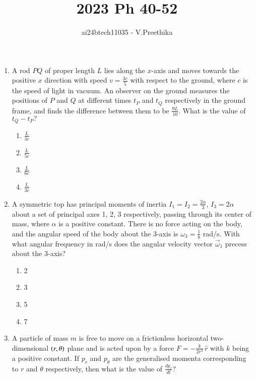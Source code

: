 \documentclass[journal]{IEEEtran}
\begin{document}

\vspace{3cm}

\title{2023 Ph 40-52}
\author{ai24btech11035 - V.Preethika}
\maketitle
\bigskip

\renewcommand{\thefigure}{\theenumi}
\renewcommand{\thetable}{\theenumi}
\begin{enumerate}
\item A rod $PQ$ of proper length $L$ lies along the $x$-axis and moves towards the positive $x$ direction with speed $v = \frac{3c}{5}$ with respect to the ground, where $c$ is the speed of light in vacuum. An observer on the ground measures the positions of $P$ and $Q$ at different times $t_P$ and $t_Q$ respectively in the ground frame, and finds the difference between them to be $\frac{9L}{10}$. What is the value of $t_Q - t_P?$
\begin{figure}[H]
	\centering
	
\end{figure}
\begin{enumerate}
\item $\frac{L}{3c}$
\item $\frac{L}{5c}$
\item $\frac{L}{6c}$
\item $\frac{L}{3c}$
\end{enumerate}
\item A symmetric top has principal moments of inertia $I_1 = I_2 = \frac{2\alpha}{3}$, $I_3 = 2\alpha$ about a set of principal axes 1, 2, 3 respectively, passing through its center of mass, where $\alpha$ is a positive constant. There is no force acting on the body, and the angular speed of the body about the 3-axis is $\omega_3 = \frac{1}{8}$ rad/s. With what angular frequency in rad/s does the angular velocity vector $\vec{\omega}_1$ precess about the 3-axis?
\begin{enumerate}
\item 2
\item 3
\item 5
\item 7
\end{enumerate}
\item A particle of mass $m$ is free to move on a frictionless horizontal two-dimensional $\left(r, \theta\right)$ plane and is acted upon by a force $F = -\frac{k}{2r^3} \, \hat{r}$ with $k$ being a positive constant. If $p_r$ and $p_\theta$ are the generalised momenta corresponding to $r$ and $\theta$ respectively, then what is the value of $\frac{dp_r}{dt}?$

\end{enumerate}
\end{document}
